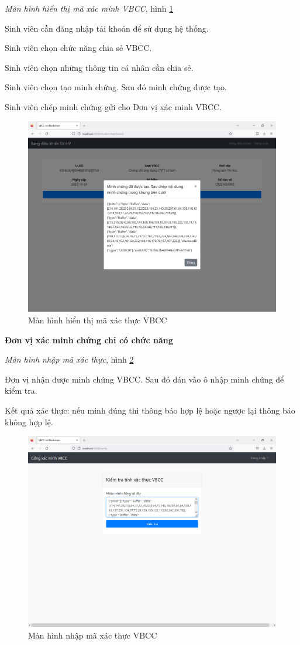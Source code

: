 \emph{Màn hình hiển thị mã xác minh VBCC}, hình \ref{fig:sv_minhchung}

Sinh viên cần đăng nhập tải khoản để sử dụng hệ thống.

Sinh viên chọn chức năng chia sẻ VBCC.

Sinh viên chọn những thông tin cá nhân cần chia sẻ.

Sinh viên chọn tạo minh chứng. Sau đó minh chứng được tạo.

Sinh viên chép minh chứng gửi cho Đơn vị xác minh VBCC.

\begin{figure}[H]
\centering
\includegraphics[width=.9\linewidth]{img/sv_minhchung.PNG}
\caption{Màn hình hiển thị mã xác thực VBCC}
\label{fig:sv_minhchung}
\end{figure}

\textbf{Đơn vị xác minh chứng chỉ có chức năng}

\emph{Màn hình nhập mã xác thực}, hình \ref{fig:v_begin}

Đơn vị nhận được minh chứng VBCC. 
Sau đó dán vào ô nhập minh chứng để kiểm tra.

Kết quả xác thực: nếu minh đúng thì thông báo hợp lệ hoặc ngược lại thông báo không hợp lệ.
\begin{figure}[H]
\centering
\includegraphics[width=.9\linewidth]{img/v_begin.PNG}
\caption{Màn hình nhập mã xác thực VBCC}
\label{fig:v_begin}
\end{figure}


